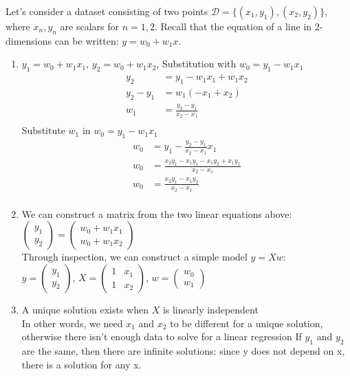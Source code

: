 \documentclass{harvardml}
\theoremstyle{definition}
\theoremstyle{plain}
\begin{document}
\begin{solution}

\noindent Let's consider a dataset consisting of two points $\mathcal{D} = \{(x_1, y_1), (x_2, y_2)\}$, where $x_n, y_n$ are scalars for $n=1, 2$. Recall that the equation of a line in 2-dimensions can be written: $y = w_0 + w_1x$. 
\begin{enumerate}
    \item $y_1 = w_0+w_1x_1$, $y_2 = w_0+w_1x_2$, Substitution with $w_0 = y_1-w_1x_1$
    \begin{align*}
        y_2 &= y_1-w_1x_1+w_1x_2\\
        y_2-y_1 &= w_1(-x_1+x_2)\\
        w_1 &= \frac{y_2-y_1}{x_2-x_1}\\
    \end{align*}
    Substitute $w_1$ in $w_0 = y_1-w_1x_1$
    \begin{align*}
        w_0 &= y_1 - \frac{y_2-y_1}{x_2-x_1}x_1\\
        w_0 &= \frac{x_2y_1-x_1y_1-x_1y_2+x_1y_1}{x_2-x_1}\\
        w_0 &= \frac{x_2y_1-x_1y_2}{x_2-x_1}\\
    \end{align*}
    \item We can construct a matrix from the two linear equations above:
    $\begin{pmatrix} y_1 \\ y_2 \end{pmatrix} 
    = \begin{pmatrix} w_0 + w_1x_1 \\ w_0+w_1x_2 \end{pmatrix}$\\
    Through inspection, we can construct a simple model $y=Xw$:\\
    $y = \begin{pmatrix} y_1 \\ y_2 \end{pmatrix}$,
    $X = \begin{pmatrix} 1 & x_1 \\ 1 & x_2\end{pmatrix}$,
    $w = \begin{pmatrix} w_0 \\ w_1\end{pmatrix}$
    \item A unique solution exists when $X$ is linearly independent\\
    In other words, we need $x_1$ and $x_2$ to be different for a unique solution,
    otherwise there isn't enough data to solve for a linear regression
    If $y_1$ and $y_2$ are the same, then there are infinite solutions: 
    since y does not depend on x, there is a solution for any x.


\end{enumerate}
\end{solution}
\end{document}
